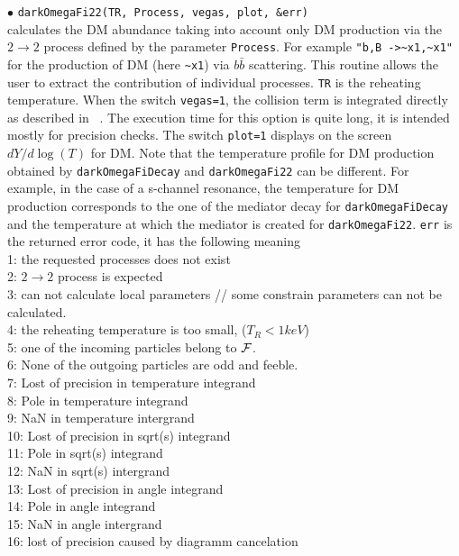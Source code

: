 \documentclass[12pt,a4paper]{article}
\begin{document}
\noindent
$\bullet$ \verb|darkOmegaFi22(TR, Process, vegas, plot, &err)|  \\
calculates the  DM abundance taking into account only DM production via the  $2\to2$ process defined by the parameter {\tt Process}. For example \verb|"b,B ->~x1,~x1"|  for the production of DM (here \verb|~x1|) via $b\bar{b}$ scattering. This routine allows the user to extract the contribution of individual processes. \verb|TR| is the  reheating temperature. When  the switch \verb|vegas=1|, the collision term is integrated directly as described in ~\cite{Belanger:2018ccd}. The execution time for this option is quite long,  it is  intended mostly for precision checks. The switch \verb|plot=1| displays on the screen  $dY/d\log(T)$ for DM. Note that the
temperature profile for DM production obtained by \verb|darkOmegaFiDecay| and \verb|darkOmegaFi22| can be different. For example, in the case  of a s-channel resonance, the temperature for DM production corresponds to the one of the mediator decay for  \verb|darkOmegaFiDecay|  and  the temperature at which the mediator is created for   \verb|darkOmegaFi22|.
{\tt err} is the  returned error code, it has the following meaning\\
1: the requested processes does not exist\\
2: $2\rightarrow 2$ process is expected\\
3: can not calculate local parameters  // some constrain parameters can not be calculated.\\
4: the reheating temperature is too small, ($T_R<1 keV$)\\
5: one of the incoming particles belong to ${\cal F}$.\\
6: None of the outgoing particles are odd  and feeble.\\
 7: Lost of precision in  temperature integrand\\
 8: Pole in temperature integrand\\
 9: NaN in temperature intergrand\\
10: Lost of precision in  sqrt(s) integrand\\
11: Pole in sqrt(s) integrand\\
12: NaN  in sqrt(s) intergrand\\
13: Lost of precision in angle integrand\\
14: Pole in angle  integrand\\
15: NaN  in angle  intergrand\\
16: lost of precision caused by diagramm cancelation\\
\end{document}
